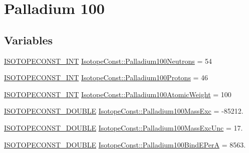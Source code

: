 \hypertarget{group___isotope_const-_palladium-_pd100}{}\section{Palladium 100}
\label{group___isotope_const-_palladium-_pd100}
\subsection*{Variables}
\begin{DoxyCompactItemize}
\item 
\mbox{\hyperlink{group___isotope_const-_macros_ga5f18360b3e99483a35c32d789e62621c}{I\+S\+O\+T\+O\+P\+E\+C\+O\+N\+S\+T\+\_\+\+I\+NT}} \mbox{\hyperlink{group___isotope_const-_palladium-_pd100_ga06131f01100f8a7b8f5897e8553d3e2a}{Isotope\+Const\+::\+Palladium100\+Neutrons}} = 54
\item 
\mbox{\hyperlink{group___isotope_const-_macros_ga5f18360b3e99483a35c32d789e62621c}{I\+S\+O\+T\+O\+P\+E\+C\+O\+N\+S\+T\+\_\+\+I\+NT}} \mbox{\hyperlink{group___isotope_const-_palladium-_pd100_gadc59fede1338ec4030002a34d14d361d}{Isotope\+Const\+::\+Palladium100\+Protons}} = 46
\item 
\mbox{\hyperlink{group___isotope_const-_macros_ga5f18360b3e99483a35c32d789e62621c}{I\+S\+O\+T\+O\+P\+E\+C\+O\+N\+S\+T\+\_\+\+I\+NT}} \mbox{\hyperlink{group___isotope_const-_palladium-_pd100_gae0111a3138e1ee7b68d6ce7286d29707}{Isotope\+Const\+::\+Palladium100\+Atomic\+Weight}} = 100
\item 
\mbox{\hyperlink{group___isotope_const-_macros_ga8f45a7272ce02c0b4c65c44636ed719a}{I\+S\+O\+T\+O\+P\+E\+C\+O\+N\+S\+T\+\_\+\+D\+O\+U\+B\+LE}} \mbox{\hyperlink{group___isotope_const-_palladium-_pd100_gad414ba95fc583f283d3efb3d7b70df80}{Isotope\+Const\+::\+Palladium100\+Mass\+Exc}} = -\/85212.
\item 
\mbox{\hyperlink{group___isotope_const-_macros_ga8f45a7272ce02c0b4c65c44636ed719a}{I\+S\+O\+T\+O\+P\+E\+C\+O\+N\+S\+T\+\_\+\+D\+O\+U\+B\+LE}} \mbox{\hyperlink{group___isotope_const-_palladium-_pd100_ga0e0fb7425f1a634e51905ff83370c33c}{Isotope\+Const\+::\+Palladium100\+Mass\+Exc\+Unc}} = 17.
\item 
\mbox{\hyperlink{group___isotope_const-_macros_ga8f45a7272ce02c0b4c65c44636ed719a}{I\+S\+O\+T\+O\+P\+E\+C\+O\+N\+S\+T\+\_\+\+D\+O\+U\+B\+LE}} \mbox{\hyperlink{group___isotope_const-_palladium-_pd100_gaf3bd96e26c7e2606b95bd7997ca6c58c}{Isotope\+Const\+::\+Palladium100\+Bind\+E\+PerA}} = 8563.
\item 

\end{DoxyCompactItemize}
